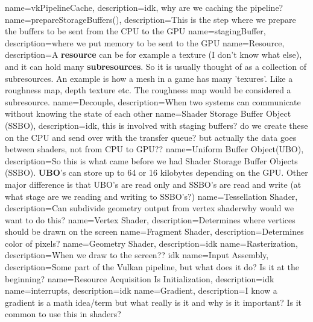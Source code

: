 \documentclass{article}
\begin{document}
{
name={vkPipelineCache},
description={idk, why are we caching the pipeline?}
}
{
name={prepareStorageBuffers()},
description={This is the step where we prepare the buffers to be
sent from the CPU to the GPU}
}
{
name={stagingBuffer},
description={where we put memory to be sent to the GPU}
}
{
name={Resource},
description={A \textbf{resource} can be for example a texture (I don't know
  what else), and it can hold many \textbf{subresources}. So it is
  usually thought of as a collection of subresources. An example is how
  a mesh in a game has many 'texures'. Like a roughness map, depth
texture etc. The roughness map would be considered a subresource.}
}
{
name={Decouple},
description={When two systems can communicate without knowing the
state of each other}
}
{
name={Shader Storage Buffer Object (SSBO)},
description={idk, this is involved with staging buffers? do we create
  these on the CPU and send over with the transfer queue? but actually
the data goes between shaders, not from CPU to GPU??}
}
{
name={Uniform Buffer Object(UBO)},
description={So this is what came before we had Shader Storage Buffer
  Objects (SSBO). \textbf{UBO}'s can store up to 64 or 16 kilobytes
  depending on the GPU. Other major difference is that UBO's are read
  only and SSBO's are read and write (at what stage are we reading and
writing to SSBO's?)}
}
{
name={Tessellation Shader},
description={Can subdivide geometry output from vertex
shader\textemdash why would we want to do this?}
}
{
name={Vertex Shader},
description={Determines where vertices should be drawn on the screen}
}
{
name={Fragment Shader},
description={Determines color of pixels?}
}
{
name={Geometry Shader},
description={idk}
}
{
name={Rasterization},
description={When we draw to the screen?? idk}
}
{
name={Input Assembly},
description={Some part of the Vulkan pipeline, but what does it do?
Is it at the beginning?}
}
{
name={Resource Acquisition Is Initialization},
description={idk}
}
{
name={interrupts},
description={idk}
}
{
name={Gradient},
description={I know a gradient is a math idea/term but what really is it
and why is it important? Is it common to use this in shaders?}
}
\end{document}
